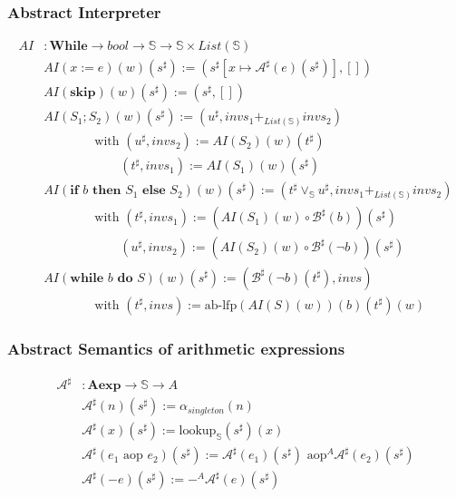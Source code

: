 \documentclass{beamer}
\begin{document}
\begin{frame}
    \frametitle{Abstract Interpreter}
\begin{align*}
AI&: \mathbf { While } \to bool \rightarrow \mathbb{S} \rightarrow \mathbb{S} \times List(\mathbb{S}) \\
&AI (x:=e) (w) (s^{\sharp}) := (s^{\sharp}[x \mapsto \mathcal{A}^{\sharp} (e) (s^{\sharp})], []) \\
&AI (\textbf{skip}) (w) (s^{\sharp}) := (s^{\sharp}, []) \\
&AI (S_1 ; S_2) (w) (s^{\sharp}) := (u^{\sharp}, invs_1 +_{List(\mathbb{S})} invs_2) \\
& \qquad \qquad \text{with } (u^{\sharp}, invs_2) := AI (S_2) (w) (t^{\sharp}) \\
& \qquad \qquad \qquad (t^{\sharp}, invs_1) := AI (S_1) (w) (s^{\sharp}) \\
&AI (\textbf {if } b \textbf { then } S_1 \textbf { else } S_2) (w) (s^{\sharp}) := (t^{\sharp} \vee_{\mathbb{S}} u^{\sharp}, invs_1 +_{List(\mathbb{S})} invs_2) \\
& \qquad \qquad \text{with } (t^{\sharp}, invs_1) := (AI ( S_1 ) (w) \circ \mathcal{B}^{\sharp} ( b )) (s^{\sharp}) \\
& \qquad \qquad \qquad (u^{\sharp}, invs_2) := (AI ( S_2 ) (w) \circ \mathcal{B}^{\sharp} ( \neg b )) (s^{\sharp}) \\
&AI (\textbf {while } b \textbf { do } S) (w) (s^{\sharp}) := (\mathcal{B}^{\sharp} ( \neg b ) (t^{\sharp}), invs)\\
& \qquad \qquad \text{with } (t^{\sharp}, invs) := \text{ab-lfp} (AI ( S ) (w)) (b) (t^{\sharp}) (w)
\end{align*}
\end{frame}


\begin{frame}
    \frametitle{Abstract Semantics of arithmetic expressions}
    \begin{align*} 
     \mathcal{A}^{\sharp} &: \mathbf{A e x p} \rightarrow \mathbb{S} \rightarrow A \\
    & \mathcal{A}^{\sharp}(n)(s^{\sharp}) := \alpha_{singleton}(n)\\
    & \mathcal{A}^{\sharp} (x) (s^{\sharp}) := \text{lookup}_\mathbb{S}(s^{\sharp})(x) \\
    & \mathcal{A}^{\sharp} ( e_1 \text{ aop } e_2 ) (s^{\sharp}) := \mathcal{A}^{\sharp} (e_1) (s^{\sharp}) \text{ aop}^A \mathcal{A}^{\sharp} (e_2) (s^{\sharp})\\
    & \mathcal{A}^{\sharp} ( -e ) (s^{\sharp}) := -^A \mathcal{A}^{\sharp} (e) (s^{\sharp})
\end{align*}
\end{frame}
\end{document}
